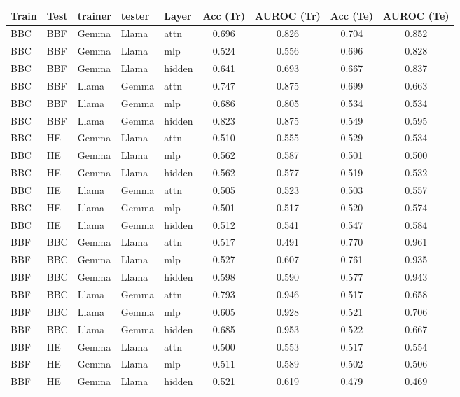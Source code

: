 \begin{table}[H]
\centering
\scriptsize
\begin{tabular}{lllllcccc}
\toprule
\textbf{Train} & \textbf{Test} & \textbf{trainer} & \textbf{tester} & \textbf{Layer} & \textbf{Acc (Tr)} & \textbf{AUROC (Tr)} & \textbf{Acc (Te)} & \textbf{AUROC (Te)} \\
\midrule
BBC & BBF & Gemma & Llama & attn & 0.696 & 0.826 & 0.704 & 0.852 \\
BBC & BBF & Gemma & Llama & mlp & 0.524 & 0.556 & 0.696 & 0.828 \\
BBC & BBF & Gemma & Llama & hidden & 0.641 & 0.693 & 0.667 & 0.837 \\
BBC & BBF & Llama & Gemma & attn & 0.747 & 0.875 & 0.699 & 0.663 \\
BBC & BBF & Llama & Gemma & mlp & 0.686 & 0.805 & 0.534 & 0.534 \\
BBC & BBF & Llama & Gemma & hidden & 0.823 & 0.875 & 0.549 & 0.595 \\
\midrule
BBC & HE & Gemma & Llama & attn & 0.510 & 0.555 & 0.529 & 0.534 \\
BBC & HE & Gemma & Llama & mlp & 0.562 & 0.587 & 0.501 & 0.500 \\
BBC & HE & Gemma & Llama & hidden & 0.562 & 0.577 & 0.519 & 0.532 \\
BBC & HE & Llama & Gemma & attn & 0.505 & 0.523 & 0.503 & 0.557 \\
BBC & HE & Llama & Gemma & mlp & 0.501 & 0.517 & 0.520 & 0.574 \\
BBC & HE & Llama & Gemma & hidden & 0.512 & 0.541 & 0.547 & 0.584 \\
\midrule
BBF & BBC & Gemma & Llama & attn & 0.517 & 0.491 & 0.770 & 0.961 \\
BBF & BBC & Gemma & Llama & mlp & 0.527 & 0.607 & 0.761 & 0.935 \\
BBF & BBC & Gemma & Llama & hidden & 0.598 & 0.590 & 0.577 & 0.943 \\
BBF & BBC & Llama & Gemma & attn & 0.793 & 0.946 & 0.517 & 0.658 \\
BBF & BBC & Llama & Gemma & mlp & 0.605 & 0.928 & 0.521 & 0.706 \\
BBF & BBC & Llama & Gemma & hidden & 0.685 & 0.953 & 0.522 & 0.667 \\
\midrule
BBF & HE & Gemma & Llama & attn & 0.500 & 0.553 & 0.517 & 0.554 \\
BBF & HE & Gemma & Llama & mlp & 0.511 & 0.589 & 0.502 & 0.506 \\
BBF & HE & Gemma & Llama & hidden & 0.521 & 0.619 & 0.479 & 0.469 \\

\end{tabular}
\end{table}
